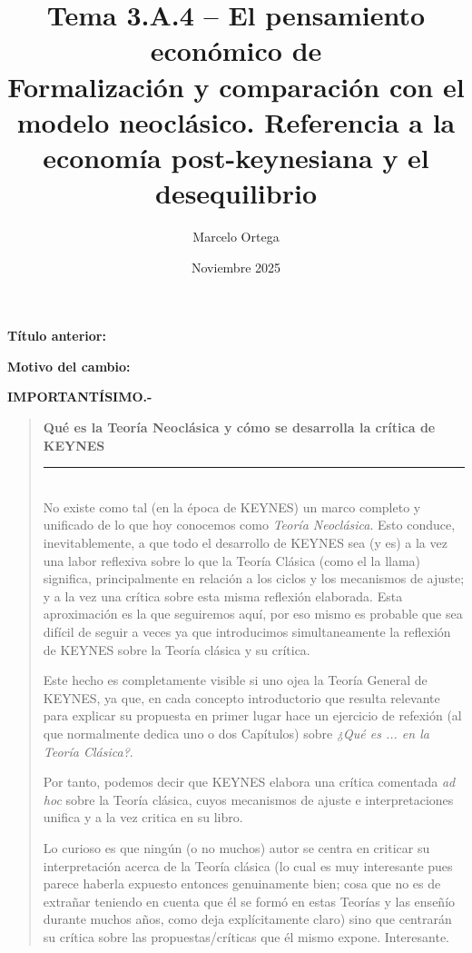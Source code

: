 \documentclass[10pt,a4paper]{article}
\title{Tema 3.A.4 -- El pensamiento económico de \authorfont{KEYNES}\\
\large Formalización y comparación con el modelo neoclásico. Referencia a la economía post-keynesiana y el desequilibrio}
\author{Marcelo Ortega}
\date{Noviembre 2025}
\newcommand{\puntosclave}[1]{%
  \begin{tcolorbox}[
    colframe=black,
    title={Puntos clave},
    before upper={\setlength{\parindent}{0.5cm}\setlength{\parskip}{0.5\baselineskip}}
  ]
  #1
  \end{tcolorbox}
}
\newenvironment{specialblock}[1]{%
      \begin{quote} %
      \small %
      \noindent\textbf{#1}\\[-0.3em] %
      \rule{\linewidth}{0.4pt}\\[0.6em]}{
      \end{quote}}
\newcommand{\changebox}{%
\begin{tcolorbox}[title={Historial de cambios del tema}]
\textbf{Título anterior:} \OldTitle\par
\textbf{Motivo del cambio:} \ChangeWhy
\end{tcolorbox}
}
\begin{document}
\maketitle
\changebox

\newpage

\puntosclave{ %
    \textbf{IMPORTANTÍSIMO.-} 
    
    \begin{specialblock}{Qué es la Teoría Neoclásica y cómo se desarrolla la crítica de KEYNES}
        No existe como tal (en la época de KEYNES) un marco completo y unificado de lo que hoy conocemos como \textit{Teoría Neoclásica}. Esto conduce, inevitablemente, a que todo el desarrollo de KEYNES sea (y es) a la vez una labor reflexiva sobre lo que la Teoría Clásica (como el la llama) significa, principalmente en relación a los ciclos y los mecanismos de ajuste; y a la vez una crítica sobre esta misma reflexión elaborada. Esta aproximación es la que seguiremos aquí, por eso mismo es probable que sea difícil de seguir a veces ya que introducimos simultaneamente la reflexión de KEYNES sobre la Teoría clásica y su crítica. 
    
        Este hecho es completamente visible si uno ojea la Teoría General de KEYNES, ya que, en cada concepto introductorio que resulta relevante para explicar su propuesta en primer lugar hace un ejercicio de refexión (al que normalmente dedica uno o dos Capítulos) sobre \textit{¿Qué es ... en la Teoría Clásica?}. 
        
        Por tanto, podemos decir que KEYNES elabora una crítica comentada \textit{ad hoc} sobre la Teoría clásica, cuyos mecanismos de ajuste e interpretaciones unifica y a la vez critica en su libro. 

        Lo curioso es que ningún (o no muchos) autor se centra en criticar su interpretación acerca de la Teoría clásica (lo cual es muy interesante pues parece haberla expuesto entonces genuinamente bien; cosa que no es de extrañar teniendo en cuenta que él se formó en estas Teorías y las enseñío durante muchos años, como deja explícitamente claro) sino que centrarán su crítica sobre las propuestas/críticas que él mismo expone. Interesante.
    \end{specialblock}
    }
\vspace{1cm}
\end{document}

